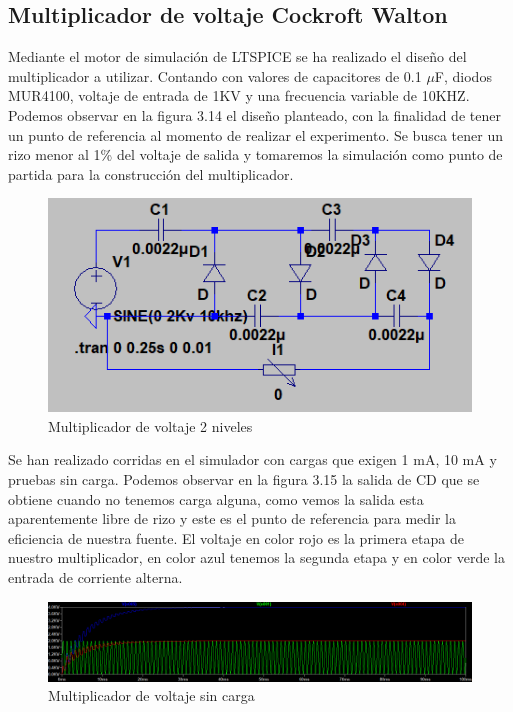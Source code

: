 \newpage


\subsection{Multiplicador de voltaje Cockroft Walton}
Mediante el motor de simulación de LTSPICE se ha realizado el diseño del multiplicador a utilizar. Contando con valores de capacitores de 0.1 $\mu$F, diodos MUR4100, voltaje de entrada de 1KV y una frecuencia variable de 10KHZ. Podemos observar en la figura 3.14 el diseño planteado, con la finalidad de tener un punto de referencia al momento de realizar el experimento. Se busca tener un rizo menor al 1\% del voltaje de salida y tomaremos la simulación como punto de partida para la construcción del multiplicador. \\

\begin{figure}[H]
\centering
\includegraphics[width=12cm]{Capitulo3/figs/multi.png}
\caption{Multiplicador de voltaje 2 niveles}
\end{figure}

Se han realizado corridas en el simulador con cargas que exigen 1 mA, 10 mA y pruebas sin carga. Podemos observar en la figura 3.15 la salida de CD que se obtiene cuando no tenemos carga alguna, como vemos la salida esta aparentemente libre de rizo y este es el punto de referencia para medir la eficiencia de nuestra fuente. El voltaje en color rojo es la primera etapa de nuestro multiplicador, en color azul tenemos la segunda etapa y en color verde la entrada de corriente alterna. 

\begin{figure}[H]
\centering
\includegraphics[width=12cm]{Capitulo3/figs/4kv.png}
\caption{Multiplicador de voltaje sin carga}
\end{figure}


